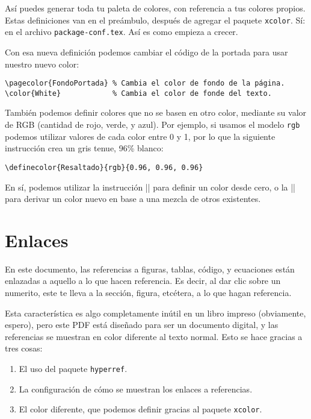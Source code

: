 Así puedes generar toda tu paleta de colores, con referencia a tus colores propios. Estas definiciones van en el preámbulo, después de agregar el paquete \texttt{xcolor}. Sí: en el archivo \texttt{package-conf.tex}. Así es como empieza a crecer.

Con esa nueva definición podemos cambiar el código de la portada para usar nuestro nuevo color:

\begin{lstlisting}[style=latex]
\pagecolor{FondoPortada} % Cambia el color de fondo de la página.
\color{White}            % Cambia el color de fonde del texto.
\end{lstlisting}

También podemos definir colores que no se basen en otro color, mediante su valor de RGB (cantidad de rojo, verde, y azul). Por ejemplo, si usamos el modelo \texttt{rgb} podemos utilizar valores de cada color entre 0 y 1, por lo que la siguiente instrucción crea un gris tenue, 96\% blanco:

\begin{lstlisting}[style=latex]
\definecolor{Resaltado}{rgb}{0.96, 0.96, 0.96}
\end{lstlisting}

En sí, podemos utilizar la instrucción |\definecolor| para definir un color desde cero, o la || para derivar un color nuevo en base a una mezcla de otros existentes.



\section{Enlaces}
\label{sec:enlaces}



En este documento, las referencias a figuras, tablas, código, y ecuaciones están enlazadas a aquello a lo que hacen referencia. Es decir, al dar clic sobre un numerito, este te lleva a la sección, figura, etcétera, a lo que hagan referencia.

Esta característica es algo completamente inútil en un libro impreso (obviamente, espero), pero este PDF está diseñado para ser un documento digital, y las referencias se muestran en color diferente al texto normal. Esto se hace gracias a tres cosas:
\begin{enumerate}
	\item El uso del paquete \texttt{hyperref}.
	\item La configuración de cómo se muestran los enlaces a referencias.
	\item El color diferente, que podemos definir gracias al paquete \texttt{xcolor}.
\end{enumerate}

